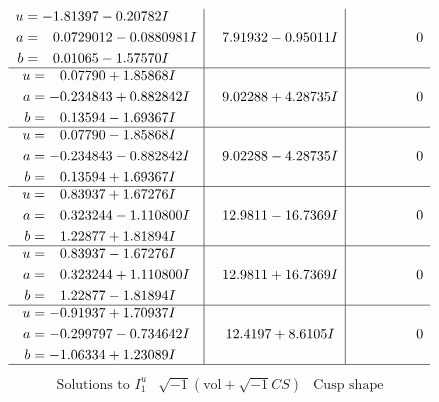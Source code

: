 \documentclass[1p]{elsarticle_modified}
\theoremstyle{definition}
\newcommand{\I}{\sqrt{-1}}
\begin{document}
$$\begin{array}{c|c|c}
\begin{aligned}
u &= -1.81397 - 0.20782 I \\
a &= \phantom{-}0.0729012 - 0.0880981 I \\
b &= \phantom{-}0.01065 - 1.57570 I\end{aligned}
 & \phantom{-}7.91932 - 0.95011 I & \phantom{-0.000000 } 0 \\ \hline\begin{aligned}
u &= \phantom{-}0.07790 + 1.85868 I \\
a &= -0.234843 + 0.882842 I \\
b &= \phantom{-}0.13594 - 1.69367 I\end{aligned}
 & \phantom{-}9.02288 + 4.28735 I & \phantom{-0.000000 } 0 \\ \hline\begin{aligned}
u &= \phantom{-}0.07790 - 1.85868 I \\
a &= -0.234843 - 0.882842 I \\
b &= \phantom{-}0.13594 + 1.69367 I\end{aligned}
 & \phantom{-}9.02288 - 4.28735 I & \phantom{-0.000000 } 0 \\ \hline\begin{aligned}
u &= \phantom{-}0.83937 + 1.67276 I \\
a &= \phantom{-}0.323244 - 1.110800 I \\
b &= \phantom{-}1.22877 + 1.81894 I\end{aligned}
 & \phantom{-}12.9811 - 16.7369 I & \phantom{-0.000000 } 0 \\ \hline\begin{aligned}
u &= \phantom{-}0.83937 - 1.67276 I \\
a &= \phantom{-}0.323244 + 1.110800 I \\
b &= \phantom{-}1.22877 - 1.81894 I\end{aligned}
 & \phantom{-}12.9811 + 16.7369 I & \phantom{-0.000000 } 0 \\ \hline\begin{aligned}
u &= -0.91937 + 1.70937 I \\
a &= -0.299797 - 0.734642 I \\
b &= -1.06334 + 1.23089 I\end{aligned}
 & \phantom{-}12.4197 + 8.6105 I & \phantom{-0.000000 } 0\\
 \hline 
 \end{array}$$\newpage$$\begin{array}{c|c|c}  
\text{Solutions to }I^u_{1}& \I (\text{vol} + \sqrt{-1}CS) & \text{Cusp shape}\\

\end{array}$$
\end{document}
